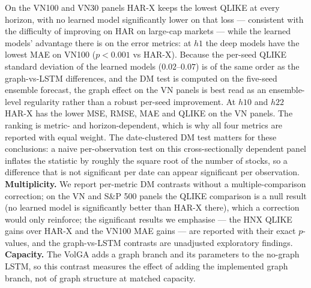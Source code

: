 \documentclass[runningheads]{llncs}
\begin{document}
On the VN100 and VN30 panels HAR-X keeps the lowest QLIKE at every horizon, with no learned model
significantly lower on that loss --- consistent with the difficulty of improving on HAR on large-cap markets ---
while the learned models' advantage there is on the error metrics: at $h1$ the deep models have the lowest MAE
on VN100 ($p<0.001$ vs HAR-X). Because the per-seed QLIKE standard deviation of the learned models
($0.02$--$0.07$) is of the same order as the graph-vs-LSTM differences, and the DM test is computed on the
five-seed ensemble forecast, the graph effect on the VN panels is best read as an ensemble-level regularity
rather than a robust per-seed improvement. At $h10$ and $h22$ HAR-X has the lower MSE, RMSE, MAE and QLIKE on the
VN panels. The ranking is metric- and horizon-dependent, which is why all four metrics are reported with
equal weight. The date-clustered DM test matters for these
conclusions: a naive per-observation test on this cross-sectionally dependent panel inflates the statistic by
roughly the square root of the number of stocks, so a difference that is not significant per date can appear
significant per observation. \textbf{Multiplicity.} We report per-metric DM contrasts without a
multiple-comparison correction; on the VN and S\&P 500 panels the QLIKE comparison is a null
result (no learned model is significantly better than HAR-X there), which a correction would only reinforce; the
significant results we emphasise --- the HNX QLIKE gains over HAR-X and the VN100 MAE gains --- are
reported with their exact $p$-values, and the graph-vs-LSTM contrasts are unadjusted exploratory findings. \textbf{Capacity.} The VolGA
adds a graph branch and its parameters to the no-graph LSTM, so this contrast measures the effect
of adding the implemented graph branch, not of graph structure at matched capacity.
\end{document}
